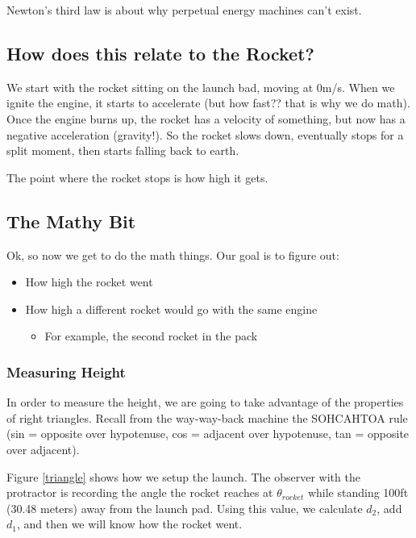 \documentclass{article}
\begin{document}
Newton's third law is about why perpetual energy machines can't exist.

\subsection{How does this relate to the Rocket?}

We start with the rocket sitting on the launch bad, moving at 0m/s.
When we ignite the engine, it starts to accelerate (but how fast?? that is why we do math).
Once the engine burns up, the rocket has a velocity of something, but now has a negative acceleration (gravity!).
So the rocket slows down, eventually stops for a split moment, then starts falling back to earth.

The point where the rocket stops is how high it gets.

\subsection{The Mathy Bit}

Ok, so now we get to do the math things.
Our goal is to figure out:
\begin{itemize}
	\item How high the rocket went
	\item How high a different rocket would go with the same engine
	\begin{itemize}
		\item For example, the second rocket in the pack
	\end{itemize}
\end{itemize}

\subsubsection{Measuring Height}

In order to measure the height, we are going to take advantage of the properties of right triangles.
Recall from the way-way-back machine the SOHCAHTOA rule (sin = opposite over hypotenuse, cos = adjacent over hypotenuse, tan = opposite over adjacent).

Figure \ref{triangle} shows how we setup the launch.
The observer with the protractor is recording the angle the rocket reaches at $\theta_{rocket}$ while standing 100ft (30.48 meters) away from the launch pad.
Using this value, we calculate $d_2$, add $d_1$, and then we will know how the rocket went. \\
\end{document}
